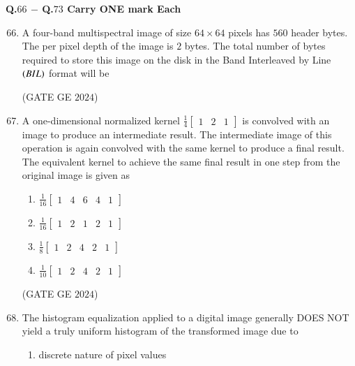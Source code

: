 \documentclass[journal,12pt,onecolumn]{IEEEtran}
\theoremstyle{remark}
\begin{document}
\textbf{Q.$66$ $-$ Q.$73$ Carry ONE mark Each}
\bigskip
\begin{enumerate}
\setcounter{enumi}{65}
\item A four-band multispectral image of size $64 \times 64$ pixels has $560$ header bytes.
The per pixel depth of the image is $2$ bytes.
The total number of bytes required to store this image on the disk in the Band Interleaved by Line $\left(BIL\right)$ format will be
\begin{enumerate}
\end{enumerate}
\hfill{(GATE GE $2024$)}
\bigskip
\item A one-dimensional normalized kernel $\frac{1}{4}\begin{bmatrix} 1 & 2 & 1 \end{bmatrix}$ is convolved with an image to produce an intermediate result.
The intermediate image of this operation is again convolved with the same kernel to produce a final result.
The equivalent kernel to achieve the same final result in one step from the original image is given as
\begin{enumerate}
\item $\frac{1}{16}\begin{bmatrix} 1 & 4 & 6 & 4 & 1 \end{bmatrix}$
\item $\frac{1}{16}\begin{bmatrix} 1 & 2 & 1 &2 & 1\end{bmatrix}$
\item $\frac{1}{8}\begin{bmatrix} 1 & 2 & 4 & 2 & 1 \end{bmatrix}$
\item $\frac{1}{10}\begin{bmatrix} 1 & 2 & 4 & 2 & 1 \end{bmatrix}$
\end{enumerate}
\hfill{(GATE GE $2024$)}
\bigskip
\item The histogram equalization applied to a digital image generally DOES NOT yield a truly uniform histogram of the transformed image due to
\begin{enumerate}
\item discrete nature of pixel values

\end{enumerate}
\end{enumerate}
\end{document}
